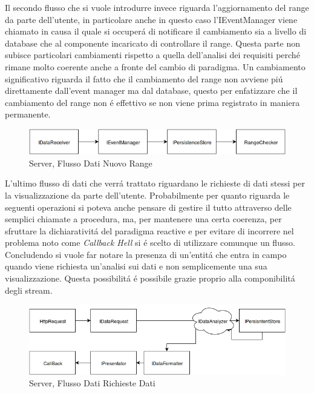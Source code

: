 Il secondo flusso che si vuole introdurre invece riguarda l'aggiornamento del range da parte dell'utente, in particolare anche in questo caso l'IEventManager viene chiamato in causa il quale si occuper\'a di notificare il cambiamento sia a livello di database che al componente incaricato di controllare il range. Questa parte non subisce particolari cambiamenti rispetto a quella dell'analisi dei requisiti perch\'e rimane molto coerente anche a fronte del cambio di paradigma. Un cambiamento significativo riguarda il fatto che il cambiamento del range non avviene pi\'u direttamente dall'event manager ma dal database, questo per enfatizzare che il cambiamento del range non \'e effettivo se non viene prima registrato in maniera permanente.

\begin{figure}[h]
\centering
\includegraphics[width=\textwidth]{Figures/LogicArchitecture/Server/FlowDiagramNewRange}
\caption{Server, Flusso Dati Nuovo Range}
\end{figure}

L'ultimo flusso di dati che verr\'a trattato riguardano le richieste di dati stessi per la visualizzazione da parte dell'utente. Probabilmente per quanto riguarda le seguenti operazioni si poteva anche pensare di gestire il tutto attraverso delle semplici chiamate a procedura, ma, per mantenere una certa coerenza, per sfruttare la dichiarativit\'a del paradigma reactive e per evitare di incorrere nel problema noto come \textit{Callback Hell} si \'e scelto di utilizzare comunque un flusso. Concludendo si vuole far notare la presenza di un'entit\'a che entra in campo quando viene richiesta un'analisi sui dati e non semplicemente una sua visualizzazione. Questa possibilit\'a \'e possibile grazie proprio alla componibilit\'a degli stream.

\newpage

\begin{figure}[h]
\centering
\includegraphics[width=\textwidth]{Figures/LogicArchitecture/Server/FlowDiagramViewData}
\caption{Server, Flusso Dati Richieste Dati}
\end{figure}


